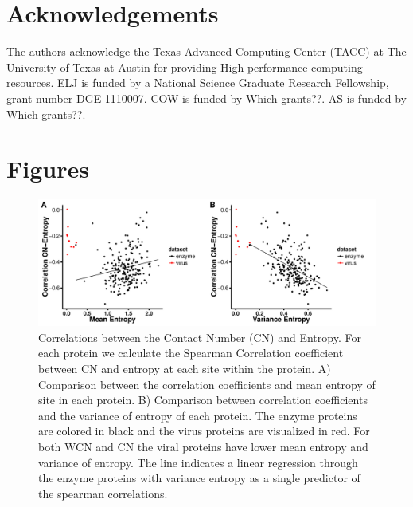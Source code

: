 \documentclass[12pt]{article}
\begin{document}
\section{Acknowledgements}
The authors acknowledge the Texas Advanced Computing Center (TACC) at The University of Texas at Austin for providing High-performance computing resources. ELJ is funded by a National Science Graduate Research Fellowship, grant number DGE-1110007. COW is funded by {\color{red} Which grants??}.  AS is funded by {\color{red} Which grants??}.


\cleardoublepage
\section*{Figures}

    \begin{figure}[H]
            \centerline{\includegraphics[width=7.5in]{entropy_cn_cor.pdf}}     
            \caption{Correlations between the Contact Number (CN) and Entropy. For each protein we calculate the Spearman Correlation coefficient between CN and entropy at each site within the protein. A) Comparison between the correlation coefficients and mean entropy of site in each protein. B) Comparison between correlation coefficients and the variance of entropy of each protein. The enzyme proteins are colored in black and the virus proteins are visualized in red. For both WCN and CN the viral proteins have lower mean entropy and variance of entropy. The line indicates a linear regression through the enzyme proteins with variance entropy as a single predictor of the spearman correlations. }
            \label{fig:entropy_cn_cor}
    \end{figure}
\end{document}
